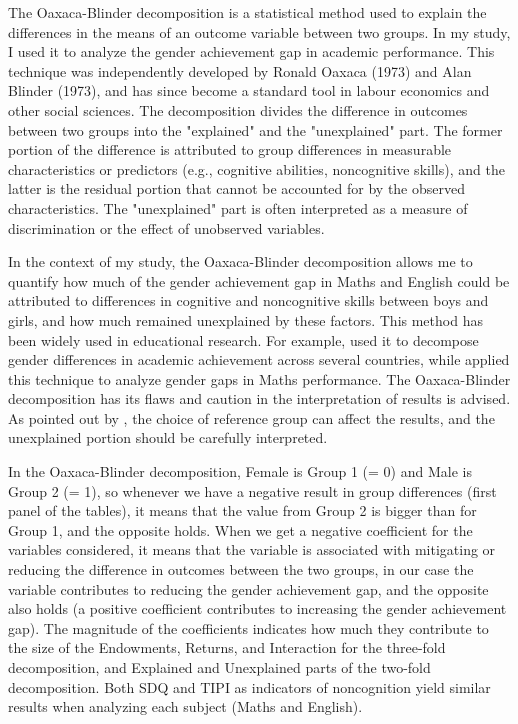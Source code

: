\documentclass[12pt,a4paper,onecolumn]{article}
\numberwithin{equation}{section}
\begin{document}
The Oaxaca-Blinder decomposition is a statistical method used to explain the differences in the means of an outcome variable between two groups. In my study, I used it to analyze the gender achievement gap in academic performance. This technique was independently developed by Ronald Oaxaca (1973) and Alan Blinder (1973), and has since become a standard tool in labour economics and other social sciences.  The decomposition divides the difference in outcomes between two groups into the "explained" and the "unexplained" part. The former portion of the difference is attributed to group differences in measurable characteristics or predictors (e.g., cognitive abilities, noncognitive skills), and the latter is the residual portion that cannot be accounted for by the observed characteristics. The "unexplained" part is often interpreted as a measure of discrimination or the effect of unobserved variables.

In the context of my study, the Oaxaca-Blinder decomposition allows me to quantify how much of the gender achievement gap in Maths and English could be attributed to differences in cognitive and noncognitive skills between boys and girls, and how much remained unexplained by these factors.
This method has been widely used in educational research. For example, \textcite{fortin2015} used it to decompose gender differences in academic achievement across several countries, while \textcite{niederle2010} applied this technique to analyze gender gaps in Maths performance.
The Oaxaca-Blinder decomposition has its flaws and caution in the interpretation of results is advised. As pointed out by \textcite{jones1984}, the choice of reference group can affect the results, and the unexplained portion should be carefully interpreted.

In the Oaxaca-Blinder decomposition, Female is Group 1 (= 0) and Male is Group 2 (= 1), so whenever we have a negative result in group differences (first panel of the tables), it means that the value from Group 2 is bigger than for Group 1, and the opposite holds. When we get a negative coefficient for the variables considered, it means that the variable is associated with mitigating or reducing the difference in outcomes between the two groups, in our case the variable contributes to reducing the gender achievement gap, and the opposite also holds (a positive coefficient contributes to increasing the gender achievement gap). The magnitude of the coefficients indicates how much they contribute to the size of the Endowments, Returns, and Interaction for the three-fold decomposition, and Explained and Unexplained parts of the two-fold decomposition. Both SDQ and TIPI as indicators of noncognition yield similar results when analyzing each subject (Maths and English). 
\end{document}
